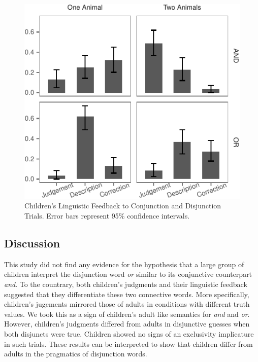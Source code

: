 \documentclass[10pt, letterpaper]{article}
\newenvironment{CodeChunk}{}{}
\begin{document}
\begin{CodeChunk}
\begin{figure}[h]

{\centering \includegraphics{figs/feedback_data-1} 

}

\caption[Children's Linguistic Feedback to Conjunction and Disjunction Trials]{Children's Linguistic Feedback to Conjunction and Disjunction Trials. Error bars represent 95\% confidence intervals.}\label{fig:feedback_data}
\end{figure}
\end{CodeChunk}

\subsection{Discussion}\label{discussion-1}

This study did not find any evidence for the hypothesis that a large
group of children interpret the disjunction word \emph{or} similar to
its conjunctive counterpart \emph{and}. To the countrary, both
children's judgments and their linguistic feedback suggested that they
differentiate these two connective words. More specifically, children's
jugements mirrored those of adults in conditions with different truth
values. We took this as a sign of children's adult like semantics for
\emph{and} and \emph{or}. However, children's judgments differed from
adults in disjunctive guesses when both disjuncts were true. Children
showed no signs of an exclusivity implicature in such trials. These
results can be interpreted to show that children differ from adults in
the pragmatics of disjunction words.
\end{document}
